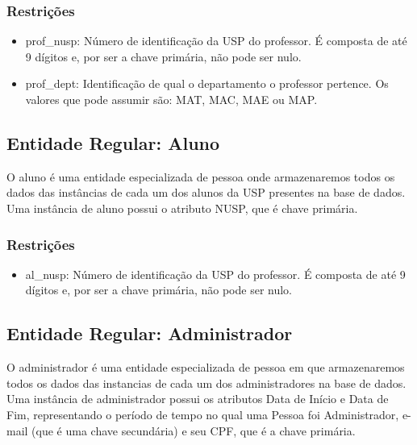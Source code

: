 \documentclass{article}
\begin{document}
      \subsubsection{Restrições}
          \begin{itemize}
              \item prof\_nusp: Número de identificação da USP do professor. É composta de até 9 dígitos e, por ser a chave primária, não pode ser nulo. 
              \item prof\_dept: Identificação de qual o departamento o professor pertence. Os valores que pode assumir são: MAT, MAC, MAE ou MAP.
          \end{itemize}
          
    \subsection{Entidade Regular: Aluno}
        \quad O aluno é uma entidade especializada de pessoa onde armazenaremos todos os dados das instâncias de cada um dos alunos da USP presentes na base de dados. \\
        \quad Uma instância de aluno possui o atributo NUSP, que é chave primária.
        \subsubsection{Restrições}
            \begin{itemize}
              \item al\_nusp: Número de identificação da USP do professor. É composta de até 9 dígitos e, por ser a chave primária, não pode ser nulo. 
          \end{itemize}
          
    \subsection{Entidade Regular: Administrador}
        \quad O administrador é uma entidade especializada de pessoa em que armazenaremos todos os dados  das instancias de cada um dos administradores na base de dados. \\
        \quad Uma instância de administrador possui os atributos Data de Início e Data de Fim, representando o período de tempo no qual uma Pessoa foi Administrador, e-mail (que é uma chave secundária) e seu CPF, que é a chave primária.
\end{document}
